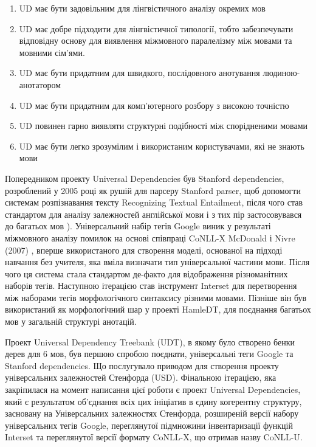 \begin{enumerate}
    \item UD має бути задовільним для лінгвістичного аналізу окремих мов
    \item UD має добре підходити для лінгвістичної типології, тобто 
    забезпечувати відповідну основу для виявлення міжмовного паралелізму між
    мовами та мовними сім’ями.
    \item UD має бути придатним для швидкого, послідовного анотування людиною-анотатором
    \item UD має бути придатним для комп'ютерного розбору з високою точністю
    \item UD повинен гарно виявляти структурні подібності між спорідненими мовами
    \item UD має бути легко зрозумілим і використаним користувачами, які не знають мови
\end{enumerate}

Попередником проекту Universal Dependencies був Stanford dependencies, розроблений у 2005 році як рушій для парсеру Stanford parser, щоб допомогти системам розпізнавання тексту Recognizing Textual Entailment, після чого став стандартом для аналізу залежностей англійської мови і з тих пір застосовувався до багатьох мов \cite{bib9}). Універсальний набір тегів Google виник у результаті міжмовного аналізу помилок на основі співпраці CoNLL-X McDonald і Nivre (2007) \cite{bib10}, вперше використаного для створення моделі, основаної на підході навчання без учителя, яка вміла визначати тип універсальної частини мови. Після чого ця система стала стандартом де-факто для відображення різноманітних наборів тегів. Наступною ітерацією став інструмент Interset для перетворення між наборами тегів морфологічного синтаксису різними мовами. Пізніше він був використаний як морфологічний шар у проекті HamleDT, для поєднання багатьох мов у загальній структурі анотацій.

Проект Universal Dependency Treebank (UDT), в якому було створено бенки дерев для 6 мов, був першою спробою поєднати, універсальні теги Google та Stanford dependencies. Що послугувало приводом для створення проекту універсальних залежностей Стенфорда (USD). Фінальною ітерацією, яка закріпилася на момент написання цієї роботи є проект Universal Dependencies, який є результатом об’єднання всіх цих ініціатив в єдину когерентну структуру, засновану на Універсальних залежностях Стенфорда, розширеній версії набору універсальних тегів Google, переглянутої підмножини інвентаризації функцій Interset та переглянутої версії формату CoNLL-X, що отримав назву CoNLL-U.

